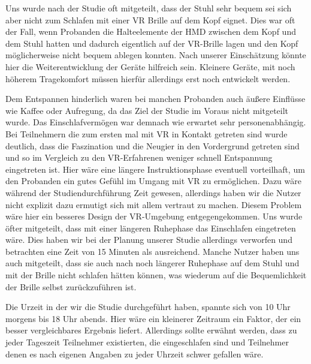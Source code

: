 Uns wurde nach der Studie oft mitgeteilt, dass der Stuhl sehr bequem sei sich aber nicht zum Schlafen mit einer VR Brille auf dem Kopf eignet. 
Dies war oft der Fall, wenn Probanden die Halteelemente der HMD zwischen dem Kopf und dem Stuhl hatten und dadurch eigentlich auf der VR-Brille lagen und den Kopf möglicherweise nicht bequem ablegen konnten. 
Nach unserer Einschätzung könnte hier die Weiterentwicklung der Geräte hilfreich sein. Kleinere Geräte, mit noch höherem Tragekomfort müssen hierfür allerdings erst noch entwickelt werden.

Dem Entspannen hinderlich waren bei manchen Probanden auch äußere Einflüsse wie Kaffee oder Aufregung, da das Ziel der Studie im Voraus nicht mitgeteilt wurde. Das Einschlafvermögen war demnach wie erwartet sehr personenabhängig.
Bei Teilnehmern die zum ersten mal mit VR in Kontakt getreten sind wurde deutlich, dass die Faszination und die Neugier in den Vordergrund getreten sind und so im Vergleich zu den VR-Erfahrenen weniger schnell Entspannung eingetreten ist. 
Hier wäre eine längere Instruktionsphase eventuell vorteilhaft, um den Probanden ein gutes Gefühl im Umgang mit VR zu ermöglichen. 
Dazu wäre während der Studiendurchführung Zeit gewesen, allerdings haben wir die Nutzer nicht explizit dazu ermutigt sich mit allem vertraut zu machen. Diesem Problem wäre hier ein besseres Design der VR-Umgebung entgegengekommen.
Uns wurde öfter mitgeteilt, dass mit einer längeren Ruhephase das Einschlafen eingetreten wäre. Dies haben wir bei der Planung unserer Studie allerdings verworfen und betrachten eine Zeit von 15 Minuten als ausreichend.
Manche Nutzer haben uns auch mitgeteilt, dass sie auch nach noch längerer Ruhephase auf dem Stuhl und mit der Brille nicht schlafen hätten können, was wiederum auf die Bequemlichkeit der Brille selbst zurückzuführen ist.

Die Urzeit in der wir die Studie durchgeführt haben, spannte sich von 10 Uhr morgens bis 18 Uhr abends. Hier wäre ein kleinerer Zeitraum ein Faktor, der ein besser vergleichbares Ergebnis liefert. 
Allerdings sollte erwähnt werden, dass zu jeder Tageszeit Teilnehmer existierten, die eingeschlafen sind und Teilnehmer denen es nach eigenen Angaben zu jeder Uhrzeit schwer gefallen wäre.

